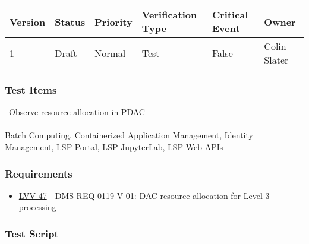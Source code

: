 \begin{longtable}[]{@{}llllll@{}}
\toprule
Version & Status & Priority & Verification Type & Critical Event &
Owner\tabularnewline
\midrule
\endhead
1 & Draft & Normal & Test & False & Colin Slater\tabularnewline
\bottomrule
\end{longtable}

\hypertarget{test-items-93}{%
\subsubsection{Test Items}\label{test-items-93}}

~Observe resource allocation in PDAC\\
~\\
Batch Computing, Containerized Application Management, Identity
Management, LSP Portal, LSP JupyterLab, LSP Web APIs

\hypertarget{requirements-94}{%
\subsubsection{Requirements}\label{requirements-94}}

\begin{itemize}
\tightlist
\item
  \href{https://jira.lsstcorp.org/browse/LVV-47}{LVV-47} -
  DMS-REQ-0119-V-01: DAC resource allocation for Level 3 processing
\end{itemize}

\hypertarget{test-script-94}{%
\subsubsection{Test Script}\label{test-script-94}}

